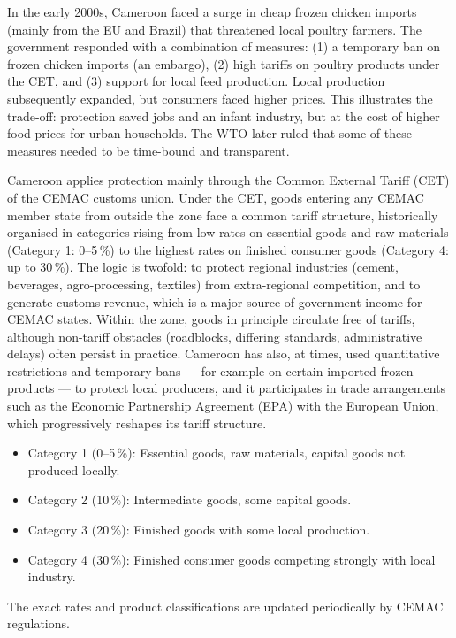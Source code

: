 \documentclass[11pt]{article}
\newcommand{\cle}[1]{{\popxbold\color{popdark}#1}}
\newcounter{popsec}
\newcounter{popsub}
\newcommand{\courssub}[1]{%
  \stepcounter{popsub}%
  \par\vspace{9pt}\noindent{\popxbold\fontsize{11.5}{13}\selectfont\color{popink}{\color{poporange}\thepopsec.\thepopsub}\hspace{6pt}#1}\par\nopagebreak\vspace{4pt}
}
\begin{document}
\begin{experience}
In the early 2000s, Cameroon faced a surge in cheap frozen chicken imports (mainly from the EU and Brazil) that threatened local poultry farmers. The government responded with a combination of measures: (1) a temporary ban on frozen chicken imports (an embargo), (2) high tariffs on poultry products under the CET, and (3) support for local feed production. Local production subsequently expanded, but consumers faced higher prices. This illustrates the trade-off: protection saved jobs and an infant industry, but at the cost of higher food prices for urban households. The WTO later ruled that some of these measures needed to be time-bound and transparent.
\end{experience}

\courssub{Protectionism in Cameroon and CEMAC}

Cameroon applies protection mainly through the \cle{Common External Tariff (CET)} of the CEMAC customs union. Under the CET, goods entering any CEMAC member state from outside the zone face a common tariff structure, historically organised in categories rising from low rates on essential goods and raw materials (Category 1: 0--5\,\%) to the highest rates on finished consumer goods (Category 4: up to 30\,\%). The logic is twofold: to protect regional industries (cement, beverages, agro-processing, textiles) from extra-regional competition, and to generate customs revenue, which is a major source of government income for CEMAC states. Within the zone, goods in principle circulate free of tariffs, although non-tariff obstacles (roadblocks, differing standards, administrative delays) often persist in practice. Cameroon has also, at times, used quantitative restrictions and temporary bans --- for example on certain imported frozen products --- to protect local producers, and it participates in trade arrangements such as the Economic Partnership Agreement (EPA) with the European Union, which progressively reshapes its tariff structure.

\begin{savaistu}
\begin{itemize}
\item Category 1 (0--5\,\%): Essential goods, raw materials, capital goods not produced locally.
\item Category 2 (10\,\%): Intermediate goods, some capital goods.
\item Category 3 (20\,\%): Finished goods with some local production.
\item Category 4 (30\,\%): Finished consumer goods competing strongly with local industry.
\end{itemize}
The exact rates and product classifications are updated periodically by CEMAC regulations.
\end{savaistu}
\end{document}
